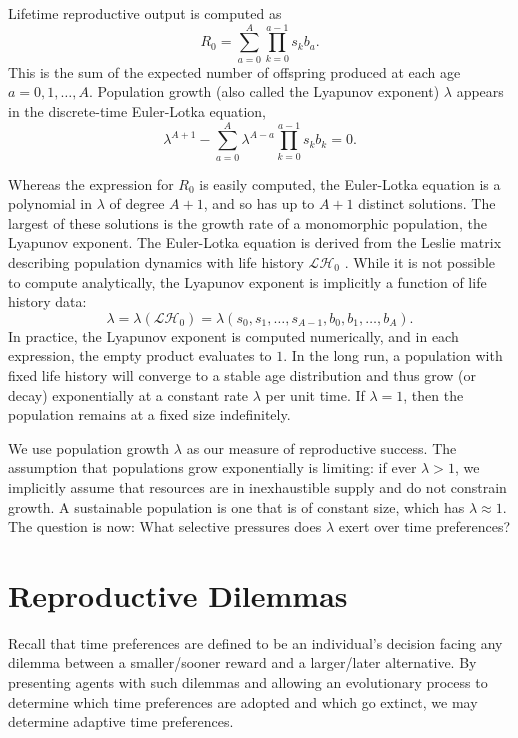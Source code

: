 \documentclass[titlepage, hidelinks, 12pt]{article}
\theoremstyle{plain}
\theoremstyle{remark}
\theoremstyle{definition}
\newcommand{\LH}{\mathcal{LH}}
\begin{document}
Lifetime reproductive output is computed as
\begin{equation}
    R_0 = \sum\limits_{a = 0}^A \prod\limits_{k = 0}^{a-1} s_k b_a.
    \label{eqn:output}
\end{equation}
This is the sum of the expected number of offspring produced at each age $a= 0, 1, \ldots, A$. 
Population growth (also called the Lyapunov exponent) $\lambda$
appears in the discrete-time Euler-Lotka equation,
\begin{equation}
    \lambda^{A+1} - \sum\limits_{a = 0}^A \lambda^{A-a} \prod\limits_{k = 0}^{a-1}s_k b_k= 0.
    \label{eqn:euler-lotka}
\end{equation}


Whereas the expression for $R_0$ is easily computed, the Euler-Lotka equation
is a polynomial in $\lambda$ of degree $A+1$, and so has up to $A+1$ distinct solutions. The largest of these solutions is the growth
rate of a monomorphic population, the Lyapunov exponent.
The Euler-Lotka equation is derived from the Leslie matrix describing population dynamics with life history $\LH_0$ \cite{stearns92}.
While it is not possible to compute analytically, the Lyapunov exponent is implicitly a function of life history data:
\begin{equation}
    \lambda = \lambda(\LH_0) = \lambda(s_0, s_1, \ldots, s_{A-1}, b_0, b_1, \ldots, b_{A}).
    \label{eqn:lambda_function}
\end{equation}
In practice, the Lyapunov exponent is computed numerically, and in each expression, the empty product evaluates to $1$. 
In the long run, a population with fixed life history will converge to a stable age distribution and
thus grow (or decay) 
exponentially at a constant rate $\lambda$ per unit time. If $\lambda = 1$, then the population remains at a fixed size indefinitely.

We use population growth $\lambda$ as our measure of reproductive success. The assumption that populations grow exponentially is limiting: if
ever $\lambda > 1$,  we implicitly assume that resources are in inexhaustible supply 
and do not constrain growth. A sustainable population is one that is of constant size, which has
$\lambda \approx 1$. The question is now: What selective pressures does $\lambda$ 
exert over time preferences?


\section{Reproductive Dilemmas}
Recall that time preferences are defined to be an individual's decision facing any dilemma between a smaller/sooner reward
and a larger/later alternative. By presenting agents with such dilemmas and allowing an evolutionary process to determine which
time preferences are adopted and which go extinct, we may determine adaptive time preferences. 
\end{document}
